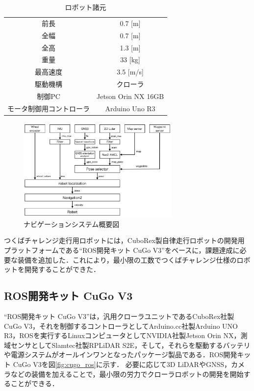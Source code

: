 \documentclass[platex,dvipdfmx]{rbproceedings}
\begin{document}
\begin{table}[bth]
    \centering
    \caption{ロボット諸元}
    \label{tab:cugo_ros_tsukuba_spec}
    \begin{tabular}{cc}
        \hline
        前長     & 0.7 [m] \\
        全幅     & 0.7 [m] \\
        全高     & 1.3 [m] \\
        重量     & 33  [kg] \\
        最高速度 & 3.5 [m/s] \\
        駆動機構 & クローラ \\
        制御PC   & Jetson Orin NX 16GB \\
        モータ制御用コントローラ & Arduino Uno R3 \\
        \hline
    \end{tabular}
\end{table}

\begin{figure}[h]
    \centering   
    \includegraphics[keepaspectratio,width=80mm]{fig/system.png}
    \caption{ナビゲーションシステム概要図}
    \label{fig:system}
\end{figure}



つくばチャレンジ走行用ロボットには，CuboRex製自律走行ロボットの開発用プラットフォームである“ROS開発キット CuGo V3”をベースに，課題達成に必要な装備を追加した．これにより，最小限の工数でつくばチャレンジ仕様のロボットを開発することができた．

\subsection{ROS開発キット CuGo V3}
“ROS開発キット CuGo V3”は，汎用クローラユニットであるCuboRex社製CuGo V3，それを制御するコントローラとしてArduino.cc社製Arduino UNO R3，ROSを実行するLinuxコンピュータとしてNVIDIA社製Jetson Orin NX，測域センサとしてSlamtec社製RPLiDAR S2E，そして，それらを駆動するバッテリや電源システムがオールインワンとなったパッケージ製品である．ROS開発キット CuGo V3を図\ref{fig:cugo_ros}に示す．
必要に応じて3D LiDARやGNSS，カメラなどの装備を加えることで，最小限の労力でクローラロボットの開発を開始することができる．
\end{document}
